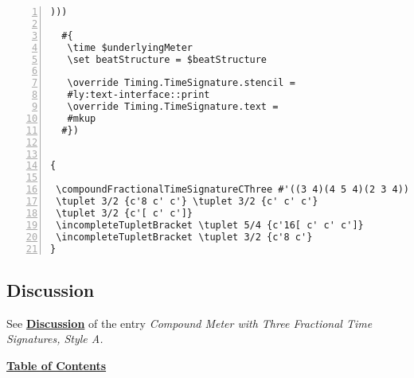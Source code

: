 \begin{Verbatim}[numbers=left,xleftmargin=5mm]
     )))

  #{
   \time $underlyingMeter
   \set beatStructure = $beatStructure

   \override Timing.TimeSignature.stencil =
   #ly:text-interface::print
   \override Timing.TimeSignature.text =
   #mkup
  #})


{

 \compoundFractionalTimeSignatureCThree #'((3 4)(4 5 4)(2 3 4)) 67/60 3,3,3,4,2
 \tuplet 3/2 {c'8 c' c'} \tuplet 3/2 {c' c' c'}
 \tuplet 3/2 {c'[ c' c']}
 \incompleteTupletBracket \tuplet 5/4 {c'16[ c' c' c']}
 \incompleteTupletBracket \tuplet 3/2 {c'8 c'}
}
\end{Verbatim}


\subsection{Discussion}
See \hyperref[sec:compoundfractionalmeter_discussion_two]{\textbf{Discussion}} of the entry \textit{Compound Meter with Three Fractional Time Signatures, Style A.}


\hyperref[sec:toc]{\textbf{Table of Contents}}

\vfill \break

